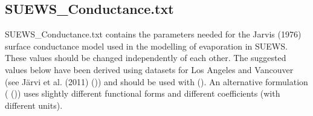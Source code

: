 \documentclass[letterpaper,10pt,english]{sphinxmanual}
\begin{document}
\subsection{SUEWS\_Conductance.txt}
\label{\detokenize{input_files/SUEWS_SiteInfo/SUEWS_Conductance:id1}}\label{\detokenize{input_files/SUEWS_SiteInfo/SUEWS_Conductance::doc}}\label{\detokenize{input_files/SUEWS_SiteInfo/SUEWS_Conductance:suews-conductance-txt}}
SUEWS\_Conductance.txt contains the parameters needed for the Jarvis
(1976) surface conductance model used in the modelling of evaporation in
SUEWS. These values should  be changed independently of each
other. The suggested values below have been derived using datasets for
Los Angeles and Vancouver (see Järvi et al. (2011) \label{\detokenize{input_files/SUEWS_SiteInfo/SUEWS_Conductance:id2}}{\hyperref[\detokenize{references:j11}]{\sphinxcrossref{{[}J11{]}}}} ()) and should be
used with {\hyperref[\detokenize{input_files/SUEWS_SiteInfo/Input_Options:cmdoption-arg-gsmodel}]{}} (). An alternative formulation
({\hyperref[\detokenize{input_files/SUEWS_SiteInfo/Input_Options:cmdoption-arg-gsmodel}]{}} ()) uses
slightly different functional forms and different coefficients (with
different units).
\end{document}
